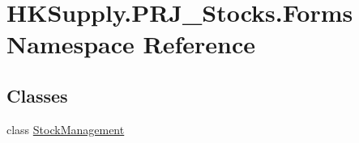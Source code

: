 \hypertarget{namespace_h_k_supply_1_1_p_r_j___stocks_1_1_forms}{}\section{H\+K\+Supply.\+P\+R\+J\+\_\+\+Stocks.\+Forms Namespace Reference}
\label{namespace_h_k_supply_1_1_p_r_j___stocks_1_1_forms}
\subsection*{Classes}
\begin{DoxyCompactItemize}
\item 
class \mbox{\hyperlink{class_h_k_supply_1_1_p_r_j___stocks_1_1_forms_1_1_stock_management}{Stock\+Management}}
\end{DoxyCompactItemize}
